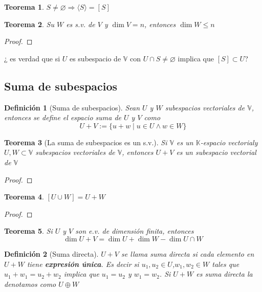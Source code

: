 \documentclass[14pt]{extarticle} %
\newtheorem{definicion}{Definición}
\newtheorem{teorema}{Teorema}
\theoremstyle{problemastyle} %
\newcommand{\kampo}{\mathbb{K}}
\newcommand{\kev}{$\kampo$-espacio vectorial}
\newcommand{\evV}{\mathbb{V}} %
\newcommand{\generado}[1]{\langle #1 \rangle}
\newcommand{\implica}{\Rightarrow}
\begin{document}
\begin{teorema}
    $S\neq  \varnothing \implica \generado{S} = [S]$
\end{teorema}

\begin{teorema}
    Su $W$ es s.v. de $V$ y $\dim V = n$, entonces $\dim W \leq n$
\end{teorema}
\begin{proof}
    \todo{}
\end{proof}

¿ es verdad que si $U$ es subespacio de $\evV$ con $U \cap S \neq \varnothing$ implica que $[S] \subset U$?

\subsection{Suma de subespacios}

\begin{definicion}[Suma de subespacios]
    Sean $U$ y $W$ subespacios vectoriales de $\evV$, entonces se define el espacio suma de $U$ y $V$ como
    $$U+V:=\{u+w\;|\;u\in U \land w \in W \}$$
    
\end{definicion}



\begin{teorema}[La suma de subespacios es un s.v.]
    Si $\evV$ es un \kev y $U,W \subset \evV$ subespacios vectoriales de $\evV$, entonces $U+V$ es un subespacio vectorial de $\evV$
\end{teorema}
\begin{proof}
    \todo{}
\end{proof}

\begin{teorema}
    $[U \cup W] = U+W$
\end{teorema}
\begin{proof}
     \todo{}
\end{proof}
\begin{teorema}
\label{dim sum e.v.}
Si $U$ y $V$ son e.v. de dimensión finita, entonces
        $$\dim U+V=\dim U + \dim W - \dim U\cap W$$
\end{teorema}

\begin{definicion}[Suma directa]
$U+V$ se llama suma directa si cada elemento en $U+W$ tiene \textbf{expresión única}. Es decir si $u_1,u_2 \in U$,$w_1,w_2\in W$ tales que $u_1+w_1 = u_2 +w_2$ implica que $u_1=u_2$ y $w_1=w_2$. Si $U+W$ es suma directa la denotamos como $U\oplus W$
\end{definicion}
\end{document}
